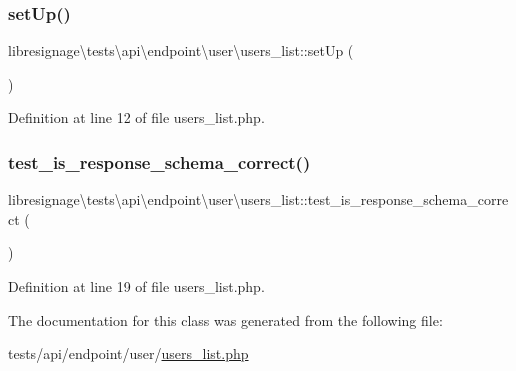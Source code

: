 \subsubsection{\texorpdfstring{set\+Up()}{setUp()}}
{\footnotesize\ttfamily libresignage\textbackslash{}tests\textbackslash{}api\textbackslash{}endpoint\textbackslash{}user\textbackslash{}users\+\_\+list\+::set\+Up (\begin{DoxyParamCaption}{ }\end{DoxyParamCaption})}



Definition at line 12 of file users\+\_\+list.\+php.

\mbox{\label{classlibresignage_1_1tests_1_1api_1_1endpoint_1_1user_1_1users__list_a5bad357968fa54cebc990700329f79c6}} 
\subsubsection{\texorpdfstring{test\+\_\+is\+\_\+response\+\_\+schema\+\_\+correct()}{test\_is\_response\_schema\_correct()}}
{\footnotesize\ttfamily libresignage\textbackslash{}tests\textbackslash{}api\textbackslash{}endpoint\textbackslash{}user\textbackslash{}users\+\_\+list\+::test\+\_\+is\+\_\+response\+\_\+schema\+\_\+correct (\begin{DoxyParamCaption}{ }\end{DoxyParamCaption})}



Definition at line 19 of file users\+\_\+list.\+php.



The documentation for this class was generated from the following file\+:\begin{DoxyCompactItemize}
\item 
tests/api/endpoint/user/\hyperlink{tests_2api_2endpoint_2user_2users__list_8php}{users\+\_\+list.\+php}\end{DoxyCompactItemize}
